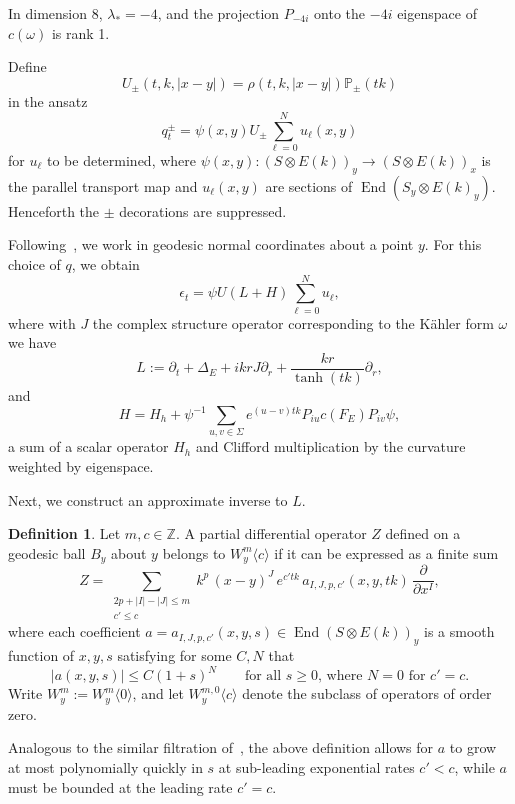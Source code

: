 \documentclass{article}
\newcommand{\inte}{\mathbb{Z}}
\newcommand{\proj}{\mathbb{P}}
\newcommand{\inv}{^{-1}}
\newcommand{\Spectrum}{\Sigma}
\DeclareMathOperator\End{End}
\theoremstyle{definition}
\newtheorem{definition}[theorem]{Definition}
\theoremstyle{remark}
\begin{document}
In dimension 8, $\lambda_* = -4$, and the projection $P_{-4i}$ onto the $-4i$ eigenspace of $c(\omega)$ is rank 1.

Define
\[
    U_{\pm}(t,k,|x-y|) = \rho(t,k,|x-y|) \proj_{\pm}(tk)
\]
in the ansatz
\begin{equation}
    \label{eq:ansatz}
    q^{\pm}_t = \psi(x,y) U_\pm \sum_{\ell=0}^N u_\ell(x,y)
\end{equation}
for $u_\ell$ to be determined, where $\psi(x,y) \colon (S \otimes E(k))_y \to (S \otimes E(k))_x$ is the parallel transport map and $u_\ell(x,y)$ are sections of $\End(S_y\otimes E(k)_y)$.
Henceforth the $\pm$ decorations are suppressed.

Following~\cite[\S 3.4]{charbonneauAsymptoticHodgeTheory2015}, we work in geodesic normal coordinates about a point $y$.
For this choice of $q$, we obtain
\[
    \epsilon_t = \psi U(L + H) \sum_{\ell=0}^N u_\ell,
\]
where with $J$ the complex structure operator corresponding to the K\"ahler form $\omega$ we have
\begin{equation}
    L := \partial_t + \Delta_E + ikrJ\partial_r + \frac{kr}{\tanh(tk)}\partial_r,
\end{equation}
and
\begin{equation}
    \label{eq:H}
    H = H_h + \psi\inv \sum_{u,v \in \Spectrum} e^{(u-v)tk} P_{iu} c(F_E) P_{iv} \psi,
\end{equation}
a sum of a scalar operator $H_h$ and Clifford multiplication by the curvature weighted by eigenspace.

Next, we construct an approximate inverse to $L$.
\begin{definition}
    \label{def:weightfilt}
    Let $m, c \in \inte$.
    A partial differential operator $Z$ defined on a geodesic ball $B_y$ about $y$ belongs to $W^m_y\langle c\rangle$ if it can be expressed as a finite sum
    \begin{equation}
        \label{eq:weightfilt}
        Z = \sum_{\substack{2p+|I|-|J| \le m \\ c' \le c}} k^p\, (x-y)^J\, e^{c'tk}\, a_{I,J,p,c'}(x,y,tk)\, \frac{\partial}{\partial x^I},
    \end{equation}
    where each coefficient $a = a_{I,J,p,c'}(x,y,s) \in \End (S \otimes E(k))_y$ is a smooth function of $x,y,s$ satisfying for some $C, N$ that
    \[
        |a(x,y,s)| \le C(1+s)^N \qquad \text{for all $s \ge 0$, where $N = 0$ for $c' = c$}.
    \]
    Write $W^m_y := W^m_y\langle 0\rangle$, and let $W^{m,0}_y\langle c\rangle$ denote the subclass of operators of order zero.
\end{definition}
Analogous to the similar filtration of~\cite[\S 3.5]{charbonneauAsymptoticHodgeTheory2015}, the above definition allows for $a$ to grow at most polynomially quickly in $s$ at sub-leading exponential rates $c' < c$, while $a$ must be bounded at the leading rate $c' = c$.
\end{document}

